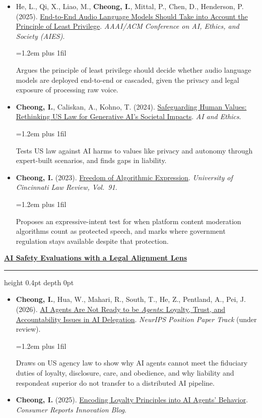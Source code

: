 \documentclass[10pt]{article}
\newcommand{\pubtheme}[1]{%
  \par\vspace{7pt}%
  \noindent
  {\small\bfseries\color{black}\uline{#1}}%
  \nobreak\hspace{0.4em}%
  \leaders\hrule height 0.4pt depth 0pt \hfill\par
  \vspace{2pt}%
}
\newcommand{\pubdesc}[1]{%
  \par\vspace{1pt}%
  \begingroup
  \leftskip=1.2em
  \rightskip=0pt plus 1fil\relax
  \parfillskip=0pt\relax
  {\footnotesize\color{black!58}#1\par}%
  \endgroup
}
\begin{document}
{\begin{itemize}[itemsep=4pt]
\item He, L., Qi, X., Liao, M., \textbf{Cheong, I.}, Mittal, P., Chen, D., Henderson, P. (2025). \href{https://arxiv.org/abs/2503.16833}{End-to-End Audio Language Models Should Take into Account the Principle of Least Privilege}. \textit{AAAI/ACM Conference on AI, Ethics, and Society (AIES)}.
\pubdesc{Argues the principle of least privilege should decide whether audio language models are deployed end-to-end or cascaded, given the privacy and legal exposure of processing raw voice.}
\item \textbf{Cheong, I.}, Caliskan, A., Kohno, T. (2024). \href{https://link.springer.com/article/10.1007/s43681-024-00451-4}{Safeguarding Human Values: Rethinking US Law for Generative AI's Societal Impacts}. \textit{AI and Ethics}.
\pubdesc{Tests US law against AI harms to values like privacy and autonomy through expert-built scenarios, and finds gaps in liability.}
\item \textbf{Cheong, I.} (2023). \href{https://papers.ssrn.com/sol3/papers.cfm?abstract_id=4167424}{Freedom of Algorithmic Expression}. \textit{University of Cincinnati Law Review, Vol.\ 91}.
\pubdesc{Proposes an expressive-intent test for when platform content moderation algorithms count as protected speech, and marks where government regulation stays available despite that protection.}
\end{itemize}
\pubtheme{AI Safety Evaluations with a Legal Alignment Lens}
\begin{itemize}[itemsep=4pt]
\item \textbf{Cheong, I.}, Hua, W., Mahari, R., South, T., He, Z., Pentland, A., Pei, J. (2026). \href{https://inyoungcheong.github.io/io/assets/pdf/agents.pdf}{AI Agents Are Not Ready to be \textit{Agents}: Loyalty, Trust, and Accountability Issues in AI Delegation}. \textit{NeurIPS Position Paper Track} (under review).
\pubdesc{Draws on US agency law to show why AI agents cannot meet the fiduciary duties of loyalty, disclosure, care, and obedience, and why liability and respondeat superior do not transfer to a distributed AI pipeline.}
\item \textbf{Cheong, I.} (2025). \href{https://innovation.consumerreports.org/encoding-loyalty-principles-into-ai-agents-behavior/}{Encoding Loyalty Principles into AI Agents' Behavior}. \textit{Consumer Reports Innovation Blog}.

\end{itemize}}
\end{document}
